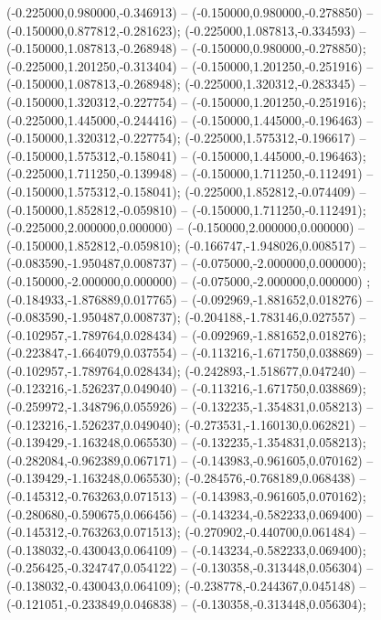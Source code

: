  (-0.225000,0.980000,-0.346913) -- (-0.150000,0.980000,-0.278850) -- (-0.150000,0.877812,-0.281623);
 (-0.225000,1.087813,-0.334593) -- (-0.150000,1.087813,-0.268948) -- (-0.150000,0.980000,-0.278850);
 (-0.225000,1.201250,-0.313404) -- (-0.150000,1.201250,-0.251916) -- (-0.150000,1.087813,-0.268948);
 (-0.225000,1.320312,-0.283345) -- (-0.150000,1.320312,-0.227754) -- (-0.150000,1.201250,-0.251916);
 (-0.225000,1.445000,-0.244416) -- (-0.150000,1.445000,-0.196463) -- (-0.150000,1.320312,-0.227754);
 (-0.225000,1.575312,-0.196617) -- (-0.150000,1.575312,-0.158041) -- (-0.150000,1.445000,-0.196463);
 (-0.225000,1.711250,-0.139948) -- (-0.150000,1.711250,-0.112491) -- (-0.150000,1.575312,-0.158041);
 (-0.225000,1.852812,-0.074409) -- (-0.150000,1.852812,-0.059810) -- (-0.150000,1.711250,-0.112491);
 (-0.225000,2.000000,0.000000) -- (-0.150000,2.000000,0.000000) -- (-0.150000,1.852812,-0.059810);
 (-0.166747,-1.948026,0.008517) -- (-0.083590,-1.950487,0.008737) -- (-0.075000,-2.000000,0.000000);
 (-0.150000,-2.000000,0.000000) -- (-0.075000,-2.000000,0.000000) ;
 (-0.184933,-1.876889,0.017765) -- (-0.092969,-1.881652,0.018276) -- (-0.083590,-1.950487,0.008737);
 (-0.204188,-1.783146,0.027557) -- (-0.102957,-1.789764,0.028434) -- (-0.092969,-1.881652,0.018276);
 (-0.223847,-1.664079,0.037554) -- (-0.113216,-1.671750,0.038869) -- (-0.102957,-1.789764,0.028434);
 (-0.242893,-1.518677,0.047240) -- (-0.123216,-1.526237,0.049040) -- (-0.113216,-1.671750,0.038869);
 (-0.259972,-1.348796,0.055926) -- (-0.132235,-1.354831,0.058213) -- (-0.123216,-1.526237,0.049040);
 (-0.273531,-1.160130,0.062821) -- (-0.139429,-1.163248,0.065530) -- (-0.132235,-1.354831,0.058213);
 (-0.282084,-0.962389,0.067171) -- (-0.143983,-0.961605,0.070162) -- (-0.139429,-1.163248,0.065530);
 (-0.284576,-0.768189,0.068438) -- (-0.145312,-0.763263,0.071513) -- (-0.143983,-0.961605,0.070162);
 (-0.280680,-0.590675,0.066456) -- (-0.143234,-0.582233,0.069400) -- (-0.145312,-0.763263,0.071513);
 (-0.270902,-0.440700,0.061484) -- (-0.138032,-0.430043,0.064109) -- (-0.143234,-0.582233,0.069400);
 (-0.256425,-0.324747,0.054122) -- (-0.130358,-0.313448,0.056304) -- (-0.138032,-0.430043,0.064109);
 (-0.238778,-0.244367,0.045148) -- (-0.121051,-0.233849,0.046838) -- (-0.130358,-0.313448,0.056304);
